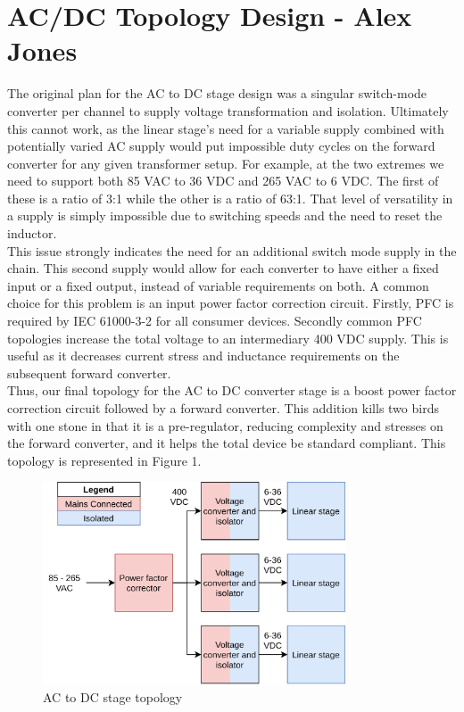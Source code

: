 \documentclass[12pt]{article}
\begin{document}
\section{AC/DC Topology Design - Alex Jones}
The original plan for the AC to DC stage design was a singular switch-mode converter per channel to supply voltage transformation and isolation. Ultimately this cannot work, as the linear stage’s need for a variable supply combined with potentially varied AC supply would put impossible duty cycles on the forward converter for any given transformer setup. For example, at the two extremes we need to support both 85 VAC to 36 VDC and 265 VAC to 6 VDC. The first of these is a ratio of 3:1 while the other is a ratio of 63:1. That level of versatility in a supply is simply impossible due to switching speeds and the need to reset the inductor.\\

This issue strongly indicates the need for an additional switch mode supply in the chain. This second supply would allow for each converter to have either a fixed input or a fixed output, instead of variable requirements on both. A common choice for this problem is an input power factor correction circuit. Firstly, PFC is required by IEC 61000-3-2 for all consumer devices. Secondly common PFC topologies increase the total voltage to an intermediary 400 VDC supply. This is useful as it decreases current stress and inductance requirements on the subsequent forward converter. \\

Thus, our final topology for the AC to DC converter stage is a boost power factor correction circuit followed by a forward converter. This addition kills two birds with one stone in that it is a pre-regulator, reducing complexity and stresses on the forward converter, and it helps the total device be standard compliant.  This topology is represented in Figure 1.

\begin{figure}[H]
    \centering
    \includegraphics[width=0.8\textwidth]{acdctopo}
    \caption{AC to DC stage topology}
    \label{fig:acdctopo}
\end{figure}
\end{document}
